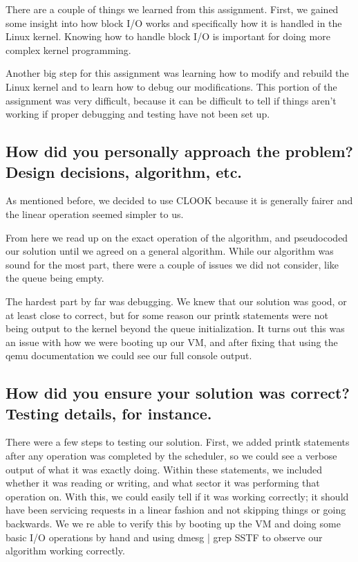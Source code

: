 \documentclass[onecolumn, draftclsnofoot,10pt, compsoc]{IEEEtran}
\begin{document}
There are a couple of things we learned from this assignment. First, we gained some insight into how block I/O works and specifically how it is handled in the Linux kernel. Knowing how to handle block I/O is important for doing more complex kernel programming.

Another big step for this assignment was learning how to modify and rebuild the Linux kernel and to learn how to debug our modifications. This portion of the assignment was very difficult, because it can be difficult to tell if things aren't working if proper debugging and testing have not been set up.

\subsection{How did you personally approach the problem? Design decisions, algorithm, etc.}

As mentioned before, we decided to use CLOOK because it is generally fairer and the linear operation seemed simpler to us. 

From here we read up on the exact operation of the algorithm, and pseudocoded our solution until we agreed on a general algorithm. While our algorithm was sound for the most part, there were a couple of issues we did not consider, like the queue being empty. 

The hardest part by far was debugging. We knew that our solution was good, or at least close to correct, but for some reason our printk statements were not being output to the kernel beyond the queue initialization. It turns out this was an issue with how we were booting up our VM, and after fixing that using the qemu documentation\cite{qemu_ref} we could see our full console output. 

\subsection{How did you ensure your solution was correct? Testing details, for instance.}

There were a few steps to testing our solution. First, we added printk statements after any operation was completed by the scheduler, so we could see a verbose output of what it was exactly doing. Within these statements, we included whether it was reading or writing, and what sector it was performing that operation on. With this, we could easily tell if it was working correctly; it should have been servicing requests in a linear fashion and not skipping things or going backwards. We we re able to verify this by booting up the VM and doing some basic I/O operations by hand and using dmesg | grep SSTF to observe our algorithm working correctly.
\end{document}
